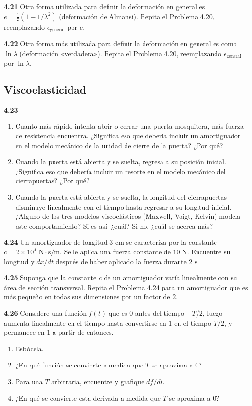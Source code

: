 \documentclass[12pt]{book}
\begin{document}
\textbf{4.21} Otra forma utilizada para definir la deformación en general es $e = \frac{1}{2}(1 - 1/\lambda^2)$ (deformación de Almansi). Repita el Problema 4.20, reemplazando $\epsilon_{\text{general}}$ por $e$.

\textbf{4.22} Otra forma más utilizada para definir la deformación en general es como $\ln \lambda$ (deformación «verdadera»). Repita el Problema 4.20, reemplazando $\epsilon_{\text{general}}$ por $\ln \lambda$.

\subsection*{Viscoelasticidad}

\textbf{4.23}
\begin{enumerate}
  \item[(a)] Cuanto más rápido intenta abrir o cerrar una puerta mosquitera, más fuerza de resistencia encuentra. ¿Significa eso que debería incluir un amortiguador en el modelo mecánico de la unidad de cierre de la puerta? ¿Por qué?
  \item[(b)] Cuando la puerta está abierta y se suelta, regresa a su posición inicial. ¿Significa eso que debería incluir un resorte en el modelo mecánico del cierrapuertas? ¿Por qué?
  \item[(c)] Cuando la puerta está abierta y se suelta, la longitud del cierrapuertas disminuye linealmente con el tiempo hasta regresar a su longitud inicial. ¿Alguno de los tres modelos viscoelásticos (Maxwell, Voigt, Kelvin) modela este comportamiento? Si es así, ¿cuál? Si no, ¿cuál se acerca más?
\end{enumerate}

\textbf{4.24} Un amortiguador de longitud $3\text{ cm}$ se caracteriza por la constante $c = 2 \times 10^4\text{ N}\cdot\text{s/m}$. Se le aplica una fuerza constante de $10\text{ N}$. Encuentre su longitud y $dx/dt$ después de haber aplicado la fuerza durante $2\text{ s}$.

\textbf{4.25} Suponga que la constante $c$ de un amortiguador varía linealmente con su área de sección transversal. Repita el Problema 4.24 para un amortiguador que es más pequeño en todas sus dimensiones por un factor de $2$.

\textbf{4.26} Considere una función $f(t)$ que es $0$ antes del tiempo $-T/2$, luego aumenta linealmente en el tiempo hasta convertirse en $1$ en el tiempo $T/2$, y permanece en $1$ a partir de entonces.
\begin{enumerate}
  \item[(a)] Esbócela.
  \item[(b)] ¿En qué función se convierte a medida que $T$ se aproxima a $0$?
  \item[(c)] Para una $T$ arbitraria, encuentre y grafique $df/dt$.
  \item[(d)] ¿En qué se convierte esta derivada a medida que $T$ se aproxima a $0$?
\end{enumerate}
\end{document}
